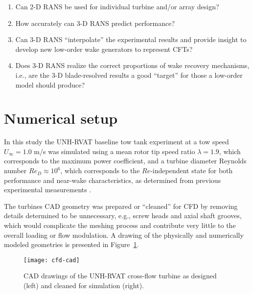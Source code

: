 \begin{enumerate}

    \item Can 2-D RANS be used for individual turbine and/or array design?

    \item How accurately can 3-D RANS predict performance?

    \item Can 3-D RANS ``interpolate'' the experimental results and provide
    insight to develop new low-order wake generators to represent CFTs?

    \item Does 3-D RANS realize the correct proportions of wake recovery
    mechanisms, i.e., are the 3-D blade-resolved results a good ``target'' for
    those a low-order model should produce?

\end{enumerate}


\section{Numerical setup}

In this study the UNH-RVAT baseline tow tank experiment at a tow speed
$U_\infty=1.0$ m/s was simulated using a mean rotor tip speed ratio
$\lambda=1.9$, which corresponds to the maximum power coefficient, and a turbine
diameter Reynolds number $Re_D \approx 10^6$, which corresponds to the
$Re$-independent state for both performance and near-wake characteristics, as
determined from previous experimental measurements \cite{Bachant2014,
    Bachant2016-Energies}.

The turbines CAD geometry was prepared or ``cleaned'' for CFD by removing
details determined to be unnecessary, e.g., screw heads and axial shaft grooves,
which would complicate the meshing process and contribute very little to the
overall loading or flow modulation. A drawing of the physically and numerically
modeled geometries is presented in Figure~\ref{fig:cfd-cad}.

\begin{figure}
    \centering
    
    \texttt{[image: cfd-cad]}
    
    \caption{CAD drawings of the UNH-RVAT cross-flow turbine as designed (left)
        and cleaned for simulation (right).}
    
    \label{fig:cfd-cad}
\end{figure}

